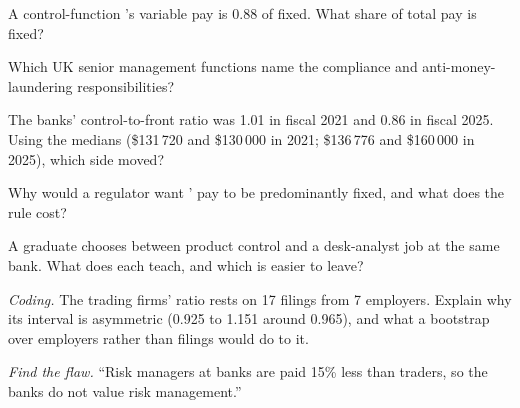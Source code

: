 \begin{exercise}[$\star$]\label{exo:in:risk-operations-product-control-and-compliance:2}
A control-function 's variable pay is 0.88 of fixed. What share of total pay is fixed?
\end{exercise}

\begin{exercise}[$\star$]\label{exo:in:risk-operations-product-control-and-compliance:3}
Which UK senior management functions name the compliance and anti-money-laundering responsibilities?
\end{exercise}

\begin{exercise}[$\star\star$]\label{exo:in:risk-operations-product-control-and-compliance:4}
The banks' control-to-front ratio was 1.01 in fiscal 2021 and 0.86 in fiscal 2025. Using the medians (\$131\,720 and
\$130\,000 in 2021; \$136\,776 and \$160\,000 in 2025), which side moved?
\end{exercise}

\begin{exercise}[$\star\star$]\label{exo:in:risk-operations-product-control-and-compliance:5}
Why would a regulator want ' pay to be predominantly fixed, and what does the rule cost?
\end{exercise}

\begin{exercise}[$\star\star$]\label{exo:in:risk-operations-product-control-and-compliance:6}
A graduate chooses between product control and a desk-analyst job at the same bank. What does each teach, and which is
easier to leave?
\end{exercise}

\begin{exercise}[$\star\star\star$]\label{exo:in:risk-operations-product-control-and-compliance:7}
\emph{Coding.} The trading firms' ratio rests on 17 filings from 7 employers. Explain why its interval is asymmetric
(0.925 to 1.151 around 0.965), and what a bootstrap over employers rather than filings would do to it.
\end{exercise}

\begin{exercise}[$\star\star\star$]\label{exo:in:risk-operations-product-control-and-compliance:8}
\emph{Find the flaw.} ``Risk managers at banks are paid 15\% less than traders, so the banks do not value risk
management.''
\end{exercise}

